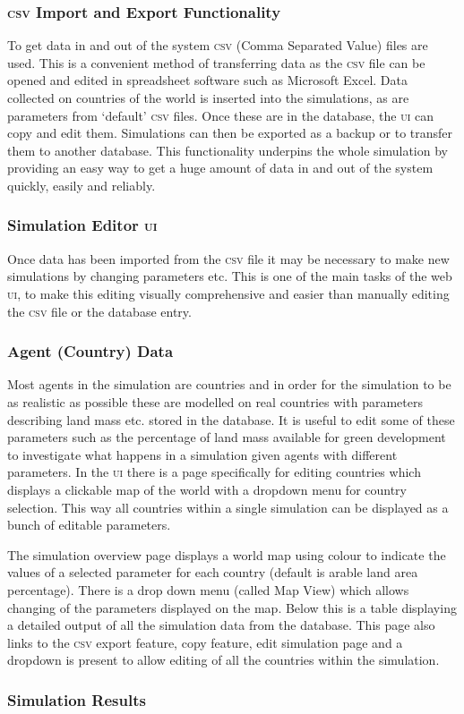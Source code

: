 \documentclass[]{article} %
\begin{document}
\subsubsection{\textsc{csv} Import and Export Functionality}

To get data in and out of the system \textsc{csv} (Comma Separated Value) files are used. This is a convenient method of transferring data as the \textsc{csv} file can be opened and edited in spreadsheet software such as Microsoft Excel. Data collected on countries of the world is inserted into the simulations, as are parameters from ‘default’ \textsc{csv} files. Once these are in the database, the \textsc{ui} can copy and edit them. Simulations can then be exported as a backup or to transfer them to another database. This functionality underpins the whole simulation by providing an easy way to get a huge amount of data in and out of the system quickly, easily and reliably.

\subsubsection{Simulation Editor \textsc{ui}}

Once data has been imported from the \textsc{csv} file it may be necessary to make new simulations by changing parameters etc. This is one of the main tasks of the web \textsc{ui}, to make this editing visually comprehensive and easier than manually editing the \textsc{csv} file or the database entry.

\subsubsection{Agent (Country) Data}

Most agents in the simulation are countries and in order for the simulation to be as realistic as possible these are modelled on real countries with parameters describing land mass etc. stored in the database. It is useful to edit some of these parameters such as the percentage of land mass available for green development to investigate what happens in a simulation given agents with different parameters. In the \textsc{ui} there is a page specifically for editing countries which displays a clickable map of the world with a dropdown menu for country selection. This way all countries within a single simulation can be displayed as a bunch of editable parameters.


The simulation overview page displays a world map using colour to indicate the values of a selected parameter for each country (default is arable land area percentage). There is a drop down menu (called Map View) which allows changing of the parameters displayed on the map. Below this is a table displaying a detailed output of all the simulation data from the database. This page also links to the \textsc{csv} export feature, copy feature, edit simulation page and a dropdown is present to allow editing of all the countries within the simulation.

\subsubsection{Simulation Results}

{}

\end{document}
